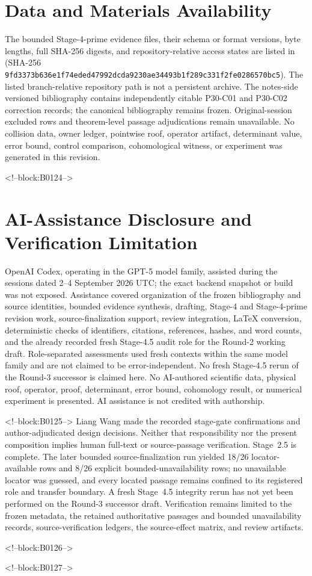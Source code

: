 \documentclass[11pt,a4paper]{article}
\begin{document}
\section*{Data and Materials Availability}
The bounded Stage-4-prime evidence files, their schema or format versions,
byte lengths, full SHA-256 digests, and repository-relative access states are
listed in 
(SHA-256 \texttt{9fd3373b636e1f74\allowbreak eded47992dcda923\allowbreak 0ae34493b1f289c3\allowbreak 31f2fe0286570bc5}).  The listed branch-relative repository path
is not a persistent archive.  The notes-side versioned bibliography contains
independently citable P30-C01 and P30-C02 correction records; the canonical
bibliography remains frozen.  Original-session excluded rows and theorem-level
passage adjudications remain unavailable.  No collision data, owner ledger,
pointwise roof, operator artifact, determinant value, error bound, control
comparison, cohomological witness, or experiment was generated in this revision.

<!--block:B0124-->
\section*{AI-Assistance Disclosure and Verification Limitation}
OpenAI Codex, operating in the GPT-5 model family, assisted during the sessions dated 2--4 September 2026 UTC; the exact backend snapshot or build was not exposed. Assistance covered organization of the frozen bibliography and source identities, bounded evidence synthesis, drafting, Stage-4 and Stage-4-prime revision work, source-finalization support, review integration, LaTeX conversion, deterministic checks of identifiers, citations, references, hashes, and word counts, and the already recorded fresh Stage-4.5 audit role for the Round-2 working draft. Role-separated assessments used fresh contexts within the same model family and are not claimed to be error-independent. No fresh Stage-4.5 rerun of the Round-3 successor is claimed here. No AI-authored scientific data, physical roof, operator, proof, determinant, error bound, cohomology result, or numerical experiment is presented. AI assistance is not credited with authorship.

<!--block:B0125-->
Liang Wang made the recorded stage-gate confirmations and author-adjudicated design decisions. Neither that responsibility nor the present composition implies human full-text or source-passage verification. Stage~2.5 is complete. The later bounded source-finalization run yielded 18/26 locator-available rows and 8/26 explicit bounded-unavailability rows; no unavailable locator was guessed, and every located passage remains confined to its registered role and transfer boundary. A fresh Stage~4.5 integrity rerun has not yet been performed on the Round-3 successor draft. Verification remains limited to the frozen metadata, the retained authoritative passages and bounded unavailability records, source-verification ledgers, the source-effect matrix, and review artifacts.

<!--block:B0126-->



<!--block:B0127-->
\end{document}
